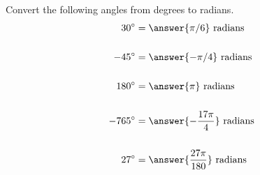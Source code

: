 \documentclass{ximera}
\author{Bobby Ramsey}
\begin{document}
\begin{exercise}

	Convert the following angles from degrees to radians.
	\begin{align*}
		30^\circ &= \answer{\pi/6} \text{ radians}\\
		\\
		-45^\circ &= \answer{-\pi/4} \text{ radians}\\		
		\\
		180^\circ &= \answer{\pi} \text{ radians}\\
		\\
		-765^\circ &= \answer{-\frac{17\pi}{4}} \text{ radians}\\
		\\
		27^\circ &= \answer{ \frac{27 \pi}{180}} \text{ radians}\\
	\end{align*}

\end{exercise}
\end{document}
